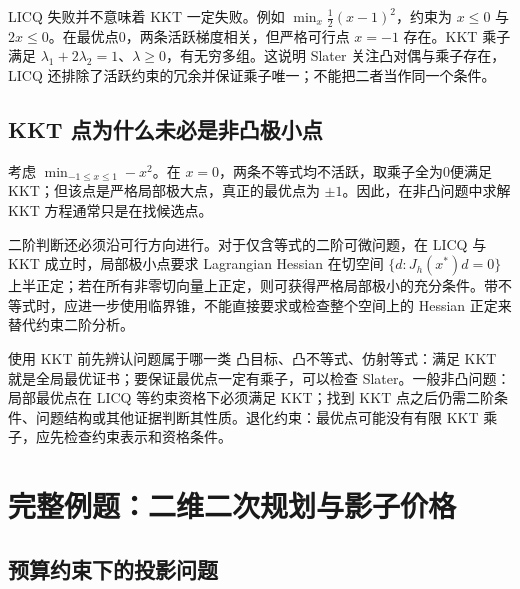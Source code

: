 LICQ 失败并不意味着 KKT 一定失败。例如 $\min_x\tfrac12(x-1)^2$，约束为 $x\leq0$ 与 $2x\leq0$。在最优点0，两条活跃梯度相关，但严格可行点 $x=-1$ 存在。KKT 乘子满足 $\lambda_1+2\lambda_2=1$、$\lambda\geq0$，有无穷多组。这说明 Slater 关注凸对偶与乘子存在，LICQ 还排除了活跃约束的冗余并保证乘子唯一；不能把二者当作同一个条件。

\subsection{KKT 点为什么未必是非凸极小点}

考虑 $\min_{-1\leq x\leq1}-x^2$。在 $x=0$，两条不等式均不活跃，取乘子全为0便满足 KKT；但该点是严格局部极大点，真正的最优点为 $\pm1$。因此，在非凸问题中求解 KKT 方程通常只是在找候选点。

二阶判断还必须沿可行方向进行。对于仅含等式的二阶可微问题，在 LICQ 与 KKT 成立时，局部极小点要求 Lagrangian Hessian 在切空间 $\{d:J_h(x^*)d=0\}$ 上半正定；若在所有非零切向量上正定，则可获得严格局部极小的充分条件。带不等式时，应进一步使用临界锥，不能直接要求或检查整个空间上的 Hessian 正定来替代约束二阶分析。

\begin{coursebox}{使用 KKT 前先辨认问题属于哪一类}
凸目标、凸不等式、仿射等式：满足 KKT 就是全局最优证书；要保证最优点一定有乘子，可以检查 Slater。一般非凸问题：局部最优点在 LICQ 等约束资格下必须满足 KKT；找到 KKT 点之后仍需二阶条件、问题结构或其他证据判断其性质。退化约束：最优点可能没有有限 KKT 乘子，应先检查约束表示和资格条件。
\end{coursebox}

\section{完整例题：二维二次规划与影子价格}
\label{l2:worked}

\subsection{预算约束下的投影问题}


